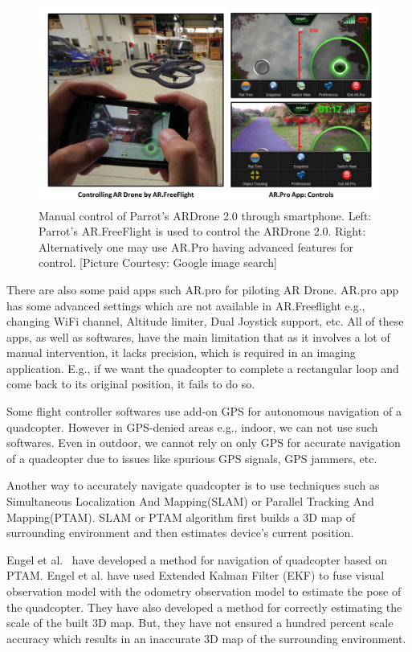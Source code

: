 \begin{figure}[h!]
  \includegraphics[width=\textwidth]{figures/manualControl}
   \caption[Manual control of Parrot's ARDrone 2.0]{Manual control of Parrot's
  ARDrone 2.0 through smartphone. Left: Parrot's AR.FreeFlight is used to
  control the ARDrone 2.0. 
  Right: Alternatively one may use AR.Pro having advanced features for control.
  [Picture Courtesy: Google image search]}
   \label{fig:manualControl}
\end{figure}

There are also some paid apps such AR.pro for piloting AR Drone. AR.pro app
has some advanced settings which are not available in AR.Freeflight e.g.,
changing WiFi channel, Altitude limiter, Dual Joystick support, etc. All of
these apps, as well as softwares, have the main limitation that as it involves a lot of manual
intervention, it lacks precision, which is required in an imaging application.
E.g., if we want the quadcopter to complete a rectangular loop and come back to its original
position, it fails to do so. 

Some flight controller softwares use add-on GPS for autonomous navigation of
a quadcopter. However in GPS-denied areas e.g., indoor, we can not use such
softwares. Even in outdoor, we cannot rely on only GPS for accurate
navigation of a quadcopter due to issues like spurious GPS signals, GPS jammers,
etc.

Another way to accurately navigate quadcopter is to use techniques such as
Simultaneous Localization And Mapping(SLAM)\cite{Davison:2007} or Parallel Tracking And
Mapping(PTAM)\cite{klein}. SLAM or PTAM algorithm first builds a 3D map of
surrounding environment and then estimates device's current position.

Engel et al.~\cite{Engel12} have developed a method for navigation of quadcopter
based on PTAM\cite{klein}. Engel et al. have used Extended Kalman Filter (EKF)
to fuse visual observation model with the odometry observation model to estimate
the pose of the quadcopter. They have also developed a method for
correctly estimating the scale of the built 3D map. But, they have not ensured
a hundred percent scale accuracy which results in an inaccurate 3D map of
the surrounding environment.

